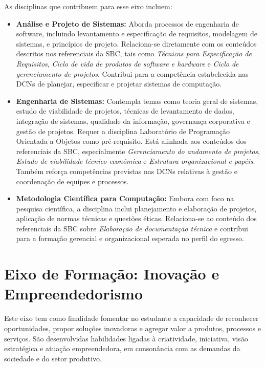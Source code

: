 As disciplinas que contribuem para esse eixo incluem:

\begin{itemize}
  \item \textbf{Análise e Projeto de Sistemas:} Aborda processos de engenharia de software, incluindo levantamento e especificação de requisitos, modelagem de sistemas, e princípios de projeto. Relaciona-se diretamente com os conteúdos descritos nos referenciais da SBC, tais como \textit{Técnicas para Especificação de Requisitos}, \textit{Ciclo de vida de produtos de software e hardware} e \textit{Ciclo de gerenciamento de projetos}. Contribui para a competência estabelecida nas DCNs de planejar, especificar e projetar sistemas de computação.

  \item \textbf{Engenharia de Sistemas:} Contempla temas como teoria geral de sistemas, estudo de viabilidade de projetos, técnicas de levantamento de dados, integração de sistemas, qualidade da informação, governança corporativa e gestão de projetos. Requer a disciplina Laboratório de Programação Orientada a Objetos como pré-requisito. Está alinhada aos conteúdos dos referenciais da SBC, especialmente \textit{Gerenciamento do andamento de projetos}, \textit{Estudo de viabilidade técnico-econômica} e \textit{Estrutura organizacional e papéis}. Também reforça competências previstas nas DCNs relativas à gestão e coordenação de equipes e processos.

  \item \textbf{Metodologia Científica para Computação:} Embora com foco na pesquisa científica, a disciplina inclui planejamento e elaboração de projetos, aplicação de normas técnicas e questões éticas. Relaciona-se ao conteúdo dos referenciais da SBC sobre \textit{Elaboração de documentação técnica} e contribui para a formação gerencial e organizacional esperada no perfil do egresso.
\end{itemize}

\section*{Eixo de Formação: Inovação e Empreendedorismo}

Este eixo tem como finalidade fomentar no estudante a capacidade de reconhecer oportunidades, propor soluções inovadoras e agregar valor a produtos, processos e serviços. São desenvolvidas habilidades ligadas à criatividade, iniciativa, visão estratégica e atuação empreendedora, em consonância com as demandas da sociedade e do setor produtivo.

